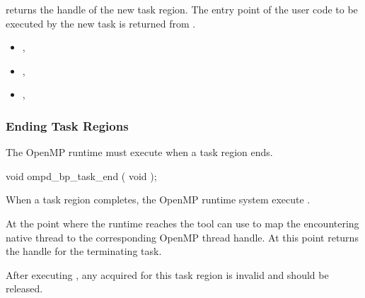  returns the handle of the new task region.
The entry point of the user code to be executed by the new task
is returned from
.

%
%

\crossreferences
\begin{itemize}
\item
  , 
\item
  , 
\item
  , 
\end{itemize}

\subsubsection{Ending Task Regions}
\label{subsubsec:ompd_bp_task_end}

\summary
The OpenMP runtime must execute %
when a task region ends.


\begin{cspecific}
\begin{ompSyntax}
void ompd_bp_task_end ( void );
\end{ompSyntax}
\end{cspecific}


\descr

When a task region completes, the OpenMP runtime system
execute .

At the point where the runtime reaches 
the tool can use
to map the encountering native thread to the corresponding
OpenMP thread handle.
At this point 
returns the handle for the terminating task.

After %
executing , any  acquired for this
task region is invalid and should be released.

